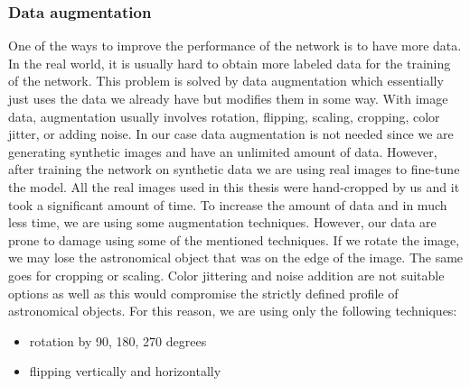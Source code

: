 \subsubsection{Data augmentation }
One of the ways to improve the performance of the network is to have more data. In the real world, it is usually hard to obtain more labeled data for the training of the network. This problem is solved by data augmentation which essentially just uses the data we already have but modifies them in some way. With image data, augmentation usually involves rotation, flipping, scaling, cropping, color jitter, or adding noise. 
In our case data augmentation is not needed since we are generating synthetic images and have an unlimited amount of data. However, after training the network on synthetic data we are using real images to fine-tune the model. All the real images used in this thesis were hand-cropped by us and it took a significant amount of time. To increase the amount of data and in much less time, we are using some augmentation techniques. However, our data are prone to damage using some of the mentioned techniques. If we rotate the image, we may lose the astronomical object that was on the edge of the image. The same goes for cropping or scaling. Color jittering and noise addition are not suitable options as well as this would compromise the strictly defined profile of astronomical objects. For this reason, we are using only the following techniques: 

\begin{itemize}
    \item rotation by 90, 180, 270 degrees
    \item flipping vertically and horizontally
\end{itemize}
